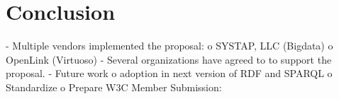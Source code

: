 \section{Conclusion}
-	Multiple vendors implemented the proposal:
o	SYSTAP, LLC (Bigdata)
o	OpenLink (Virtuoso)
-	Several organizations have agreed to to support the proposal.
-	Future work
o	adoption in next version of RDF and SPARQL
o	Standardize
o	Prepare W3C Member Submission:

